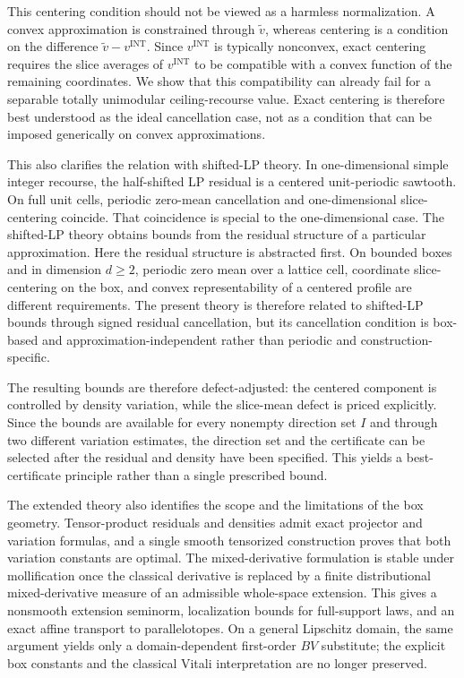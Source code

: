 \documentclass[11pt,letterpaper]{article}
\theoremstyle{definition}
\theoremstyle{remark}
\newcommand{\INT}{\mathrm{INT}}
\begin{document}
This centering condition should not be viewed as a harmless normalization. A
convex approximation is constrained through $\widetilde v$, whereas centering
is a condition on the difference $\widetilde v-v^{\INT}$. Since
$v^{\INT}$ is typically nonconvex, exact centering requires the slice averages
of $v^{\INT}$ to be compatible with a convex function of the remaining
coordinates. We show that this compatibility can already fail for a separable
totally unimodular ceiling-recourse value. Exact centering is therefore best
understood as the ideal cancellation case, not as a condition that can be
imposed generically on convex approximations.

This also clarifies the relation with shifted-LP theory. In one-dimensional
simple integer recourse, the half-shifted LP residual is a centered
unit-periodic sawtooth. On full unit cells, periodic zero-mean cancellation and
one-dimensional slice-centering coincide. That coincidence is special to the one-dimensional case. The
shifted-LP theory obtains bounds from the residual structure of a particular
approximation. Here the residual structure is abstracted first. On bounded
boxes and in dimension $d\geq2$, periodic zero mean over a lattice cell,
coordinate slice-centering on the box, and convex representability of a
centered profile are different requirements. The present theory is therefore
related to shifted-LP bounds through signed residual cancellation, but its
cancellation condition is box-based and approximation-independent rather than
periodic and construction-specific.

The resulting bounds are therefore defect-adjusted: the centered component is
controlled by density variation, while the slice-mean defect is priced
explicitly. Since the bounds are available for every nonempty direction set
$I$ and through two different variation estimates, the direction set and the
certificate can be selected after the residual and density have been specified.
This yields a best-certificate principle rather than a single prescribed bound.

The extended theory also identifies the scope and the limitations of the box
geometry. Tensor-product residuals and densities admit exact projector and
variation formulas, and a single smooth tensorized construction proves that
both variation constants are optimal. The mixed-derivative formulation is stable
under mollification once the classical derivative is replaced by a finite
distributional mixed-derivative measure of an admissible whole-space extension.
This gives a nonsmooth extension seminorm, localization bounds for full-support
laws, and an exact affine transport to parallelotopes. On a general Lipschitz
domain, the same argument yields only a domain-dependent first-order $BV$
substitute; the explicit box constants and the classical Vitali interpretation
are no longer preserved.
\end{document}
